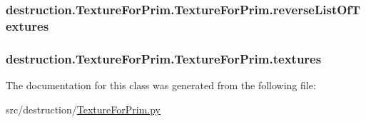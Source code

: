 \hypertarget{classdestruction_1_1_texture_for_prim_1_1_texture_for_prim_ac9ca3892054498bd99e35a4f99fc024f}{
\subsubsection[{reverse\-List\-Of\-Textures}]{\setlength{\rightskip}{0pt plus 5cm}destruction.\-Texture\-For\-Prim.\-Texture\-For\-Prim.\-reverse\-List\-Of\-Textures}}\label{classdestruction_1_1_texture_for_prim_1_1_texture_for_prim_ac9ca3892054498bd99e35a4f99fc024f}
\hypertarget{classdestruction_1_1_texture_for_prim_1_1_texture_for_prim_a9bdff9474b5dabeae69900f6dfaf3370}{
\subsubsection[{textures}]{\setlength{\rightskip}{0pt plus 5cm}destruction.\-Texture\-For\-Prim.\-Texture\-For\-Prim.\-textures}}\label{classdestruction_1_1_texture_for_prim_1_1_texture_for_prim_a9bdff9474b5dabeae69900f6dfaf3370}


The documentation for this class was generated from the following file\-:\begin{DoxyCompactItemize}
\item 
src/destruction/\hyperlink{_texture_for_prim_8py}{Texture\-For\-Prim.\-py}\end{DoxyCompactItemize}
